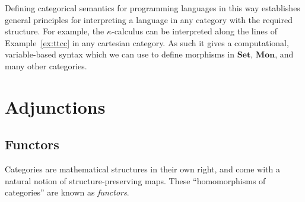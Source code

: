 \documentclass[11pt,oneside,draft]{book}
\newtheorem{example}[theorem]{Example}
\theoremstyle{definition}
\newcommand{\kw}[1]{\ensuremath{ \mathsf{#1} }}
\begin{document}

Defining categorical semantics for programming languages in this way
establishes general principles
for interpreting a language in any category
with the required structure.
For example,
the $\kappa$-calculus
\citep{kappa}
can be interpreted
along the lines of Example~\ref{ex:ttcc}
in any cartesian category.
As such it gives a computational,
variable-based syntax
which we can use to define morphisms
in $\mathbf{Set}$, $\mathbf{Mon}$,
and many other categories.



\section{Adjunctions} %

\subsection{Functors} %

Categories are mathematical structures in their own right,
and come with a natural notion of
structure-preserving maps.
These ``homomorphisms of categories'' are known as \emph{functors}.
\end{document}
